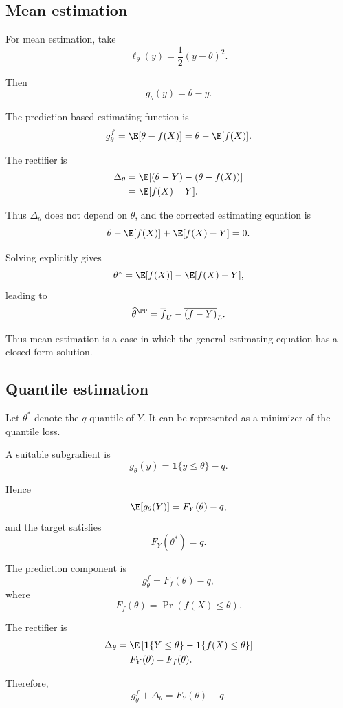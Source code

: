 \subsection{Mean estimation}

For mean estimation, take
\[
\ell_\theta(y)
=
\frac{1}{2}(y-\theta)^2.
\]

Then
\[
g_\theta(y)
=
\theta-y.
\]

The prediction-based estimating function is
\[
g_\theta^f
=
\E[\theta-f(X)]
=
\theta-\E[f(X)].
\]

The rectifier is
\[
\begin{aligned}
\Delta_\theta
&=
\E[
(\theta-Y)-(\theta-f(X))
]
\\
&=
\E[f(X)-Y].
\end{aligned}
\]

Thus $\Delta_\theta$ does not depend on $\theta$, and the corrected
estimating equation is
\[
\theta-\E[f(X)]
+
\E[f(X)-Y]
=
0.
\]

Solving explicitly gives
\[
\theta^*
=
\E[f(X)]
-
\E[f(X)-Y],
\]
leading to
\[
\widehat\theta^{\PP}
=
\overline f_U
-
\overline{(f-Y)}_L.
\]

Thus mean estimation is a case in which the general estimating equation
has a closed-form solution.

\subsection{Quantile estimation}

Let $\theta^*$ denote the $q$-quantile of $Y$. It can be represented as a
minimizer of the quantile loss.

A suitable subgradient is
\[
\boxed{
g_\theta(y)
=
\mathbf{1}\{y\leq\theta\}-q.
}
\]

Hence
\[
\E[g_\theta(Y)]
=
F_Y(\theta)-q,
\]
and the target satisfies
\[
F_Y(\theta^*)=q.
\]

The prediction component is
\[
g_\theta^f
=
F_f(\theta)-q,
\]
where
\[
F_f(\theta)
=
\Pr(f(X)\leq\theta).
\]

The rectifier is
\[
\begin{aligned}
\Delta_\theta
&=
\E\left[
\mathbf{1}\{Y\leq\theta\}
-
\mathbf{1}\{f(X)\leq\theta\}
\right]
\\
&=
F_Y(\theta)-F_f(\theta).
\end{aligned}
\]

Therefore,
\[
g_\theta^f+\Delta_\theta
=
F_Y(\theta)-q.
\]

